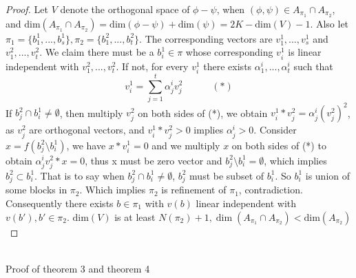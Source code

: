 \documentclass[11pt]{amsart}
\begin{document}
\begin{proof}
Let $V$ denote the orthogonal space of $\phi - \psi$, when $(\phi,\psi)\in A_{\pi_1} \cap A_{\pi_2}$, and $\text{dim}(A_{\pi_1} \cap A_{\pi_2}) = \text{dim}(\phi - \psi) + \text{dim}(\psi) = 2K - \text{dim}(V) - 1$. Also let $\pi_1 = \{b_1^1,...,b_s^1\}, \pi_2 = \{b_1^2,...,b_t^2\}$. The corresponding vectors are $v_1^1,...,v_s^1$ and $v_1^2,...,v_t^2$. We claim there must be a $b_i^1\in \pi$ whose corresponding $v_i^1$ is linear independent with $v_1^2,...,v_t^2$. If not, for every $v_i^1$ there exists $\alpha_1^i,...,\alpha_t^i$ such that 
\[
v_i^1 = \sum_{j = 1}^t \alpha_j^i v_j^2 \quad\quad\quad(*)
\]
If $b_j^2 \cap b_i^1 \neq \emptyset$, then multiply $v_j^2$ on both sides of (*), we obtain $v_i^1 * v_j^2 = \alpha_j^i (v_j^2)^2$, as $v_j^2$ are orthogonal vectors, and $v_i^1 * v_j^2 > 0$ implies $\alpha_j^i > 0$. Consider $x = f(b_j^2\setminus b_i^1)$, we have $x*v_i^1 = 0$ and we multiply $x$ on both sides of (*) to obtain $\alpha_j^i v_j^2*x = 0$, thus x must be zero vector and $b_j^2\setminus b_i^1= \emptyset$, which implies $b_j^2 \subset b_i^1$. That is to say when $b_j^2 \cap b_i^1 \neq \emptyset$, $b_j^2$ must be subset of $b_i^1$. So $b_i^1$ is union of some blocks in $\pi_2$. Which implies $\pi_2$ is refinement of $\pi_1$, contradiction.\\
Consequently there exists $b\in\pi_1$ with $v(b)$ linear independent with $v(b'), b'\in\pi_2$. $\text{dim}(V)$ is at least $N(\pi_2) + 1, \dim(A_{\pi_1} \cap A_{\pi_2}) < \text{dim}(A_{\pi_2})$
\end{proof}
\hfill\\
Proof of theorem 3 and theorem 4
\end{document}
